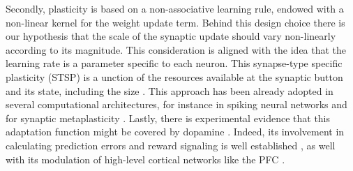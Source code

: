 Secondly, plasticity is based on a non-associative learning rule, endowed with a non-linear kernel for the weight update term.
Behind this design choice there is our hypothesis that the scale of the synaptic update should vary non-linearly according to its magnitude.
This consideration is aligned with the idea that the learning rate is a parameter specific to each neuron. This synapse-type specific plasticity (STSP) \cite{larsenSynapsetypespecificPlasticityLocal2015} is a  unction of the resources available at the synaptic button and its state, including the size \cite{blackmanTargetcellspecificShorttermPlasticity2013, bartolHippocampalSpineHead2015, arielIntrinsicVariabilityPv2012}.
This approach has been already adopted in several computational architectures, for instance in spiking neural networks \cite{inglisModulationDopamineAdaptive2021} and for synaptic metaplasticity \cite{iigayaAdaptiveLearningDecisionmaking2016}.
Lastly, there is experimental evidence that this adaptation function might be covered by dopamine \cite{toblerAdaptiveCodingReward2005}.
Indeed, its involvement in calculating prediction errors and reward signaling is well established \cite{schultzNeuralSubstratePrediction1997}, as well with its modulation of  high-level cortical networks like the PFC \cite{didomenicoDopaminergicModulationPrefrontal2023, lohaniDopamineModulationPrefrontal2019, dardenneRolePrefrontalCortex2012}.


